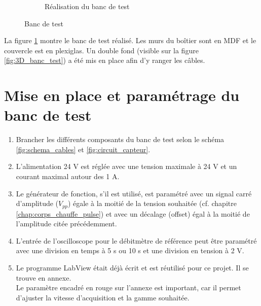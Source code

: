 \begin{figure}[H]
\begin{subfigure}{0.45\textwidth}
        \caption{Réalisation du banc de test}
        \label{fig:banc_test_reel}
    \end{subfigure}
    \caption{Banc de test}
    \label{fig:banc_test}
\end{figure}

La figure \ref{fig:banc_test_reel} montre le banc de test réalisé. Les murs du boîtier sont en MDF et le couvercle est en plexiglas. Un double 
fond (visible sur la figure \ref{fig:3D_banc_test}) a été mis en place afin d'y ranger les câbles. 

\newpage
\section{Mise en place et paramétrage du banc de test}
\begin{enumerate}
    \item Brancher les différents composants du banc de test selon le schéma \ref{fig:schema_cables} et \ref{fig:circuit_capteur}.
    \item L'alimentation 24 V est réglée avec une tension maximale à 24 V et un courant maximal autour des 1 A.
    \item Le générateur de fonction, s'il est utilisé, est paramétré avec un signal carré d'amplitude ($V_{pp}$) égale à la moitié de la tension souhaitée
          (cf. chapitre \ref{chap:corps_chauffe_pulse}) et avec un décalage (offset) égal à la moitié de l'amplitude citée précédemment. 
    \item L'entrée de l'oscilloscope pour le débitmètre de référence peut être paramétré avec une division en temps à 5 s ou 10 s et une division
          en tension à 2 V. 
    \item Le programme LabView était déjà écrit et est réutilisé pour ce projet. Il se trouve en annexe. \\
          Le paramètre encadré en rouge sur l'annexe est important, car il permet d'ajuster la vitesse d'acquisition et la gamme souhaitée. 
          
          

\end{enumerate}
